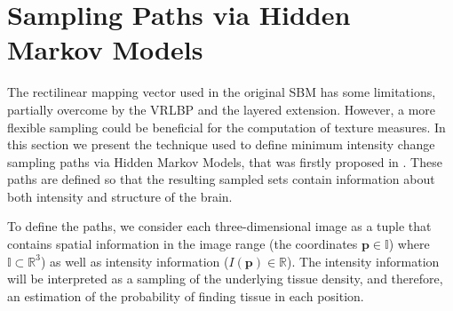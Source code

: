 \section{Sampling Paths via Hidden Markov Models}
The rectilinear mapping vector used in the original \ac{SBM} \cite{Martinez-Murcia2014225,Martinez-MurciaVRLBP,Martinez-Murcia2015} has some limitations, partially overcome by the \ac{VRLBP} and the layered extension. However, a more flexible sampling could be beneficial for the computation of texture measures. In this section we present the technique used to define minimum intensity change sampling paths via Hidden Markov Models, that was firstly proposed in \cite{Martinez-Murcia2016}. These paths are defined so that the resulting sampled sets contain information about both intensity and structure of the brain. 

To define the paths, we consider each three-dimensional image as a tuple that contains spatial information in the image range (the coordinates $\mathbf{p} \in \mathbb{I}$) where $\mathbb{I}\subset \mathbb{R}^3$) as well as intensity information ($I(\mathbf{p}) \in \mathbb{R}$). The intensity information will be interpreted as a sampling of the underlying tissue density, and therefore, an estimation of the probability of finding tissue in each position. 

